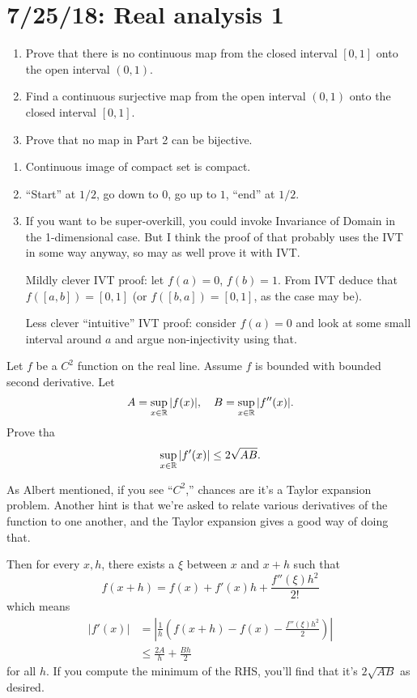 \section{7/25/18: Real analysis 1}
\begin{problem}\hfill
	\begin{enumerate}
		\item Prove that there is no continuous map from the closed interval $[0,1]$ onto the open interval $(0,1)$.
		\item Find a continuous surjective map from the open interval $(0,1)$ onto the closed interval $[0,1]$.
		\item Prove that no map in Part 2 can be bijective.
	\end{enumerate}
\end{problem}
\begin{solution}\hfill
	\begin{enumerate}
		\item Continuous image of compact set is compact.
		\item ``Start'' at $1/2$, go down to $0$, go up to $1$, ``end'' at $1/2$.
		\item If you want to be super-overkill, you could invoke Invariance of Domain in the 1-dimensional case. But I think the proof of that probably uses the IVT in some way anyway, so may as well prove it with IVT.
		
		Mildly clever IVT proof: let $f(a) = 0$, $f(b) = 1$. From IVT deduce that $f([a,b]) = [0,1]$ (or $f([b,a])=[0,1]$, as the case may be).
		
		Less clever ``intuitive'' IVT proof: consider $f(a) = 0$ and look at some small interval around $a$ and argue non-injectivity using that.
	\end{enumerate}
\end{solution}

\begin{problem}
	Let $f$ be a $C^2$ function on the real line. Assume $f$ is bounded with bounded second derivative. Let
	\[
		A = \sup_{x\in \mathbb{R}} |f(x)|, \quad B = \sup_{x\in \mathbb{R}} |f''(x)|.
	\]
	Prove tha
	\[
		\sup_{x\in \mathbb{R}} |f'(x)| \leq 2\sqrt{AB}.
	\]
\end{problem}
\begin{solution}
	As Albert mentioned, if you see ``$C^2$,'' chances are it's a Taylor expansion problem. Another hint is that we're asked to relate various derivatives of the function to one another, and the Taylor expansion gives a good way of doing that.
	
	Then for every $x,h$, there exists a $\xi$ between $x$ and $x+h$ such that
	\[
		f(x + h) = f(x) + f'(x)h + \frac{f''(\xi)h^2}{2!}
	\]
	which means
	\begin{align*}
		|f'(x)| &= \left|\frac{1}{h} \left(f(x+h) - f(x) - \frac{f''(\xi)h^2}{2}\right)\right|\\
		&\leq \frac{2A}{h} + \frac{Bh}{2}
	\end{align*}
	for all $h$. If you compute the minimum of the RHS, you'll find that it's $2\sqrt{AB}$ as desired. 
\end{solution}


